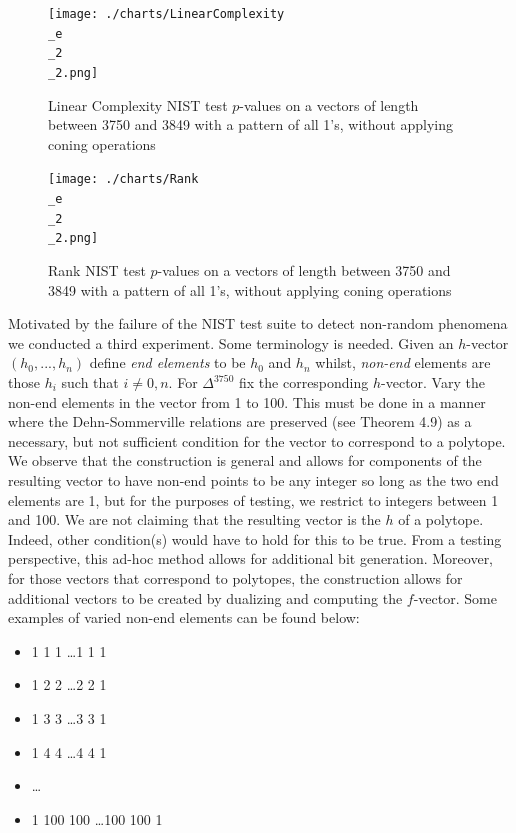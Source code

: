 \documentclass[oneside,12pt]{amsart}
\theoremstyle{definition}
\numberwithin{equation}{section}
\begin{document}
\begin{figure}[h!]
\centering
\caption{Linear Complexity NIST test $p$-values on a vectors of length between 3750 and 3849 with a pattern of all 1's, without applying coning operations}
\texttt{[image: ./charts/LinearComplexity\\\_e\\\_2\\\_2.png]}
\label{fig:linearcomplexity22}
\end{figure}

\begin{figure}[h!]
\centering
\caption{Rank NIST test $p$-values on a vectors of length between 3750 and 3849 with a pattern of all 1's, without applying coning operations}
\texttt{[image: ./charts/Rank\\\_e\\\_2\\\_2.png]}
\label{fig:rank22}
\end{figure}

\clearpage
\indent Motivated by the failure of the NIST test suite to detect non-random phenomena we conducted a third experiment. Some terminology is needed.  Given an $h$-vector $(h_0,...,h_n)$ define \textit{end elements} to be $h_0$ and $h_n$ whilst, \textit{non-end} elements are those $h_i$ such that $i \neq 0,n$.
For $\Delta^{3750}$ fix the corresponding $h$-vector.  Vary the non-end elements in the vector from 1 to 100. This must be done in a manner where the Dehn-Sommerville relations are preserved (see Theorem 4.9) as a necessary, but not sufficient condition for the vector to correspond to a polytope.  We observe that the construction is general and allows for components of the resulting vector to have non-end points to be any integer so long as the two end elements are 1, but for the purposes of testing, we restrict to integers between 1 and 100.  We are not claiming that the resulting vector is the $h$ of a polytope.  Indeed, other condition(s) would have to hold for this to be true.  From a testing perspective, this ad-hoc method allows for additional bit generation.  Moreover, for those vectors that correspond to polytopes, the construction allows for additional vectors to be created by dualizing and computing the $f$-vector.  Some examples of varied non-end elements can be found below:    %


\begin{itemize}
\centering
\item[] 1 1 1 \ldots 1 1 1
\item[] 1 2 2 \ldots 2 2 1
\item[] 1 3 3 \ldots 3 3 1
\item[] 1 4 4 \ldots4 4 1
\item[] \ldots
\item[] 1 100 100 \ldots 100 100 1
\end{itemize}
\end{document}
